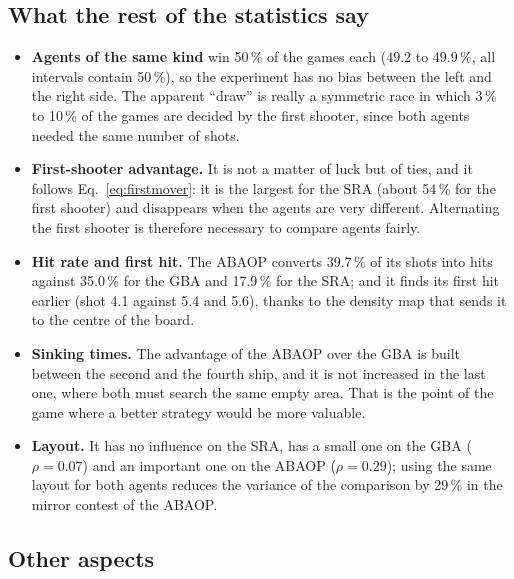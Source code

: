\documentclass[letterpaper,11pt]{article} %
\begin{document}
\subsection{What the rest of the statistics say}

\begin{itemize}
    \item \textbf{Agents of the same kind} win 50\,\% of the games each ($49.2$ to $49.9\,\%$, all intervals contain 50\,\%), so the experiment has no bias between the left and the right side. The apparent ``draw'' is really a symmetric race in which 3\,\% to 10\,\% of the games are decided by the first shooter, since both agents needed the same number of shots.
    \item \textbf{First-shooter advantage.} It is not a matter of luck but of ties, and it follows Eq.~\eqref{eq:firstmover}: it is the largest for the SRA (about 54\,\% for the first shooter) and disappears when the agents are very different. Alternating the first shooter is therefore necessary to compare agents fairly.
    \item \textbf{Hit rate and first hit.} The ABAOP converts 39.7\,\% of its shots into hits against 35.0\,\% for the GBA and 17.9\,\% for the SRA; and it finds its first hit earlier (shot 4.1 against 5.4 and 5.6), thanks to the density map that sends it to the centre of the board.
    \item \textbf{Sinking times.} The advantage of the ABAOP over the GBA is built between the second and the fourth ship, and it is not increased in the last one, where both must search the same empty area. That is the point of the game where a better strategy would be more valuable.
    \item \textbf{Layout.} It has no influence on the SRA, has a small one on the GBA ($\rho=0.07$) and an important one on the ABAOP ($\rho=0.29$); using the same layout for both agents reduces the variance of the comparison by 29\,\% in the mirror contest of the ABAOP.
\end{itemize}

\subsection{Other aspects}
\end{document}
